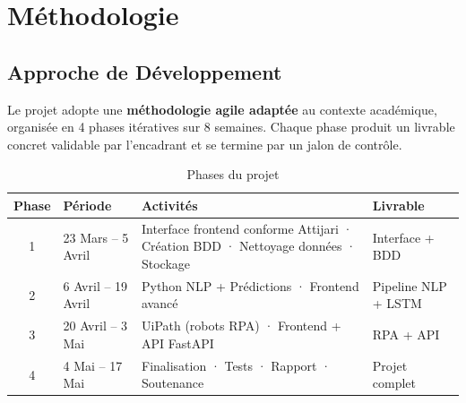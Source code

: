 \documentclass[12pt,a4paper]{report}
\begin{document}
\chapter{Méthodologie}

\section{Approche de Développement}

Le projet adopte une \textbf{méthodologie agile adaptée} au contexte académique, organisée en 4 phases itératives sur 8 semaines. Chaque phase produit un livrable concret validable par l'encadrant et se termine par un jalon de contrôle.

\begin{table}[H]
\centering
\caption{Phases du projet}
\begin{tabularx}{\textwidth}{|c|l|X|l|}
\hline
\textbf{Phase} & \textbf{Période} & \textbf{Activités} & \textbf{Livrable} \\
\hline
1 & 23 Mars -- 5 Avril & Interface frontend conforme Attijari · Création BDD · Nettoyage données · Stockage & Interface + BDD \\
\hline
2 & 6 Avril -- 19 Avril & Python NLP + Prédictions · Frontend avancé & Pipeline NLP + LSTM \\
\hline
3 & 20 Avril -- 3 Mai & UiPath (robots RPA) · Frontend + API FastAPI & RPA + API \\
\hline
4 & 4 Mai -- 17 Mai & Finalisation · Tests · Rapport · Soutenance & Projet complet \\
\hline
\end{tabularx}
\end{table}
\end{document}

